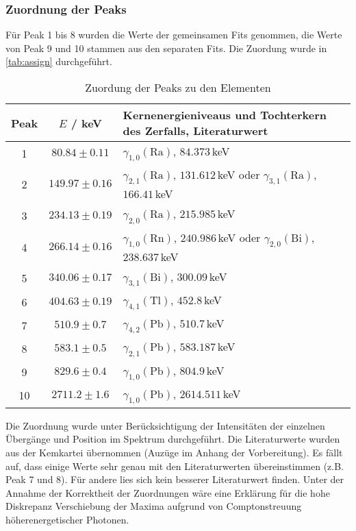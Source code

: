 \subsubsection{Zuordnung der Peaks}
Für Peak 1 bis 8 wurden die Werte der gemeinsamen Fits genommen, die Werte von Peak 9 und 10 stammen aus den separaten Fits.
Die Zuordung wurde in \autoref{tab:assign} durchgeführt.\\[\baselineskip]
\begin{table}
\caption{Zuordung der Peaks zu den Elementen}
\begin{center}
\begin{tabularx}{\textwidth}{|c|c|X|}
  \hline 
    Peak & $E$ / keV & Kernenergieniveaus und Tochterkern des Zerfalls, Literaturwert \\ \hline
      1 & $  80.84 \pm 0.11 $ &  $\gamma_{1,0}(\text{Ra})$, $84.373$\,keV \\ \hline
      2 & $ 149.97 \pm 0.16 $ &  $\gamma_{2,1}(\text{Ra})$, $131.612$\,keV oder $\gamma_{3,1}(\text{Ra})$, $166.41$\,keV \\ \hline
      3 & $ 234.13 \pm 0.19 $ &  $\gamma_{2,0}(\text{Ra})$, $215.985$\,keV \\ \hline
      4 & $ 266.14 \pm 0.16 $ &  $\gamma_{1,0}(\text{Rn})$, $240.986$\,keV oder $\gamma_{2,0}(\text{Bi})$, $238.637$\,keV \\ \hline
      5 & $ 340.06 \pm 0.17 $ &  $\gamma_{3,1}(\text{Bi})$, $300.09$\,keV \\ \hline
      6 & $ 404.63 \pm 0.19 $ &  $\gamma_{4,1}(\text{Tl})$, $452.8$\,keV \\ \hline
      7 & $ 510.9  \pm 0.7  $ &  $\gamma_{4,2}(\text{Pb})$, $510.7$\,keV \\ \hline
      8 & $ 583.1  \pm 0.5  $ &  $\gamma_{2,1}(\text{Pb})$, $583.187$\,keV \\ \hline
      9 & $ 829.6  \pm 0.4  $ &  $\gamma_{1,0}(\text{Pb})$, $804.9$\,keV \\ \hline
     10 & $ 2711.2 \pm 1.6  $ &  $\gamma_{1,0}(\text{Pb})$, $2614.511$\,keV \\ \hline
\end{tabularx}
\end{center}
\label{tab:assign}
\end{table}
Die Zuordnung wurde unter Berücksichtigung der Intensitäten der einzelnen Übergänge und Position im Spektrum durchgeführt. Die Literaturwerte 
wurden aus der Kemkartei übernommen (Auzüge im Anhang der Vorbereitung). Es fällt auf, dass einige Werte sehr genau mit den Literaturwerten 
übereinstimmen (z.B. Peak 7 und 8). Für andere lies sich kein besserer Literaturwert finden. Unter der Annahme der Korrektheit der Zuordnungen wäre 
eine Erklärung für die hohe Diskrepanz Verschiebung der Maxima aufgrund von Comptonstreuung höherenergetischer Photonen.

